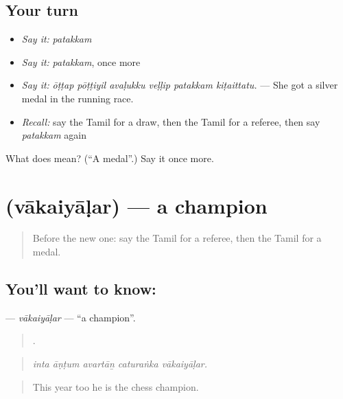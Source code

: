 \subsection*{Your turn}
\begin{itemize}
\raggedright
  \item \emph{Say it:} \emph{patakkam}
  \item \emph{Say it:} \emph{patakkam}, once more
  \item \emph{Say it:} \emph{ōṭṭap pōṭṭiyil avaḷukku veḷḷip patakkam kiṭaittatu.} — She got a silver medal in the running race.
  \item \emph{Recall:} say the Tamil for a draw, then the Tamil for a referee, then say \emph{patakkam} again
\end{itemize}

\begin{tcolorbox}[breakable,colback=teal!4,colframe=teal!35!black,title={Before you move on}]
What does  mean? (\textquotedblleft{}A medal\textquotedblright{}.) Say it once more.
\end{tcolorbox}
\section[\texorpdfstring{\ta{வாகையாளர்} (vākaiyāḷar)}{வாகையாளர் (vākaiyāḷar)}]{ (vākaiyāḷar) — a champion}

\label{lesson:TA-C534-vakaiyalar}



\begin{quote}
Before the new one: say the Tamil for a referee, then the Tamil for a medal.
\end{quote}

\subsection*{You'll want to know: }
\textbf{} — \emph{vākaiyāḷar} — \textquotedblleft{}a champion\textquotedblright{}.

\begin{quote}
    .
\end{quote}

\begin{quote}
\emph{inta āṇṭum avartāṉ caturaṅka vākaiyāḷar.}
\end{quote}

\begin{quote}
This year too he is the chess champion.
\end{quote}

